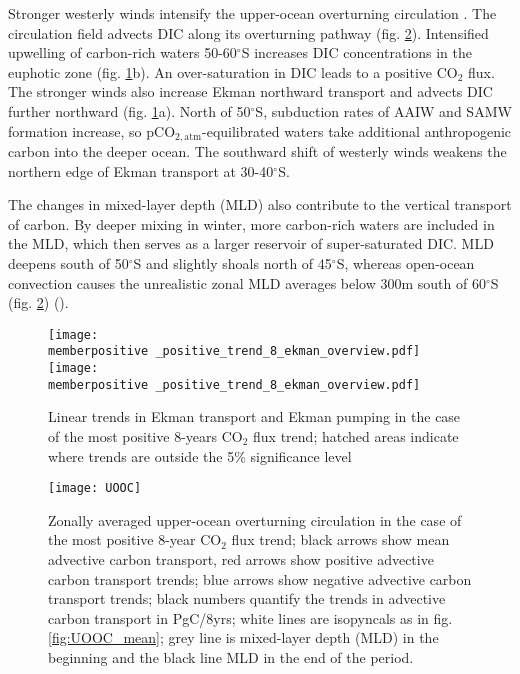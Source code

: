 \documentclass[12pt]{article}
\newcommand{\memberpositive}{m178_1985_1992} %
\begin{document}
Stronger westerly winds intensify the upper-ocean overturning circulation \citep{Lauderdale2013}. The circulation field advects DIC along its overturning pathway (fig. \ref{fig:UOOC_pos}). Intensified upwelling of carbon-rich waters 50-60$^\circ$S increases DIC concentrations in the euphotic zone (fig. \ref{fig:ekman_pos}b). An over-saturation in DIC leads to a positive CO$_2$ flux. The stronger winds also increase Ekman northward transport and advects DIC further northward (fig. \ref{fig:ekman_pos}a). North of 50$^\circ$S, subduction rates of AAIW and SAMW formation increase, so pCO$_{2,\text{atm}}$-equilibrated waters take additional anthropogenic carbon into the deeper ocean. The southward shift of westerly winds weakens the northern edge of Ekman transport at 30-40$^\circ$S. 

The changes in mixed-layer depth (MLD) also contribute to the vertical transport of carbon. By deeper mixing in winter, more carbon-rich waters are included in the MLD, which then serves as a larger reservoir of super-saturated DIC. MLD deepens south of 50$^\circ$S and slightly shoals north of 45$^\circ$S, whereas open-ocean convection causes the unrealistic zonal MLD averages below 300m south of 60$^\circ$S (fig. \ref{fig:UOOC_pos}) (\citep{Sallee2013,Stoessel2015}). 


\begin{figure}[h!]
	\centering
	\texttt{[image: \\memberpositive \_positive\_trend\_8\_ekman\_overview.pdf]}
	\texttt{[image: \\memberpositive \_positive\_trend\_8\_ekman\_overview.pdf]}
	\vspace{-5mm}
	\caption{Linear trends in Ekman transport and Ekman pumping in the case of the most positive 8-years CO$_2$ flux trend; hatched areas indicate where trends are outside the 5\% significance level}
	\label{fig:ekman_pos}
\end{figure}


\begin{figure}[h!]
	\centering
	\texttt{[image: UOOC]}
	\vspace{-5mm}
	\caption{Zonally averaged upper-ocean overturning circulation in the case of the most positive 8-year CO$_2$ flux trend; black arrows show mean advective carbon transport, red arrows show positive advective carbon transport trends; blue arrows show negative advective carbon transport trends; black numbers quantify the trends in advective carbon transport in PgC/8yrs; white lines are isopyncals as in fig. \ref{fig:UOOC_mean}; grey line is mixed-layer depth (MLD) in the beginning and the black line MLD in the end of the period.}
	\label{fig:UOOC_pos}
\end{figure}
\end{document}
